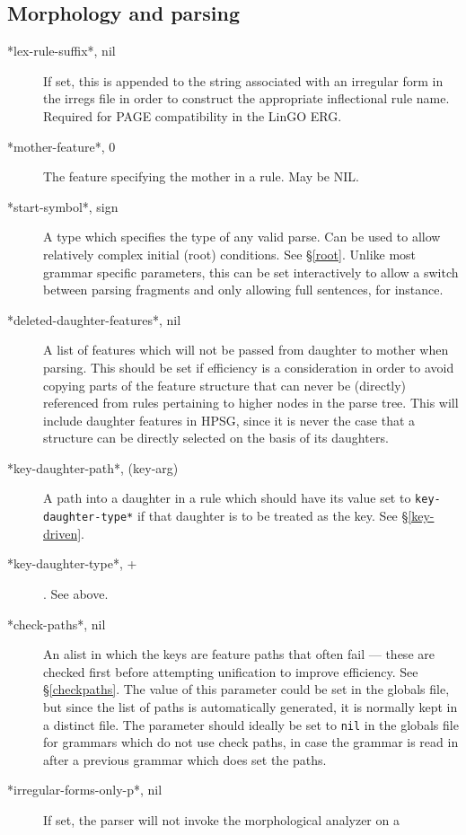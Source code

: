 \documentclass[12pt]{report}
\newcommand{\lkbparam}[1]{{\tt #1}}
\begin{document}
\subsection{Morphology and parsing}
\label{mpglob}
\begin{description}
\item[*lex-rule-suffix*, nil]  If set, this is appended to
the string associated with an irregular form in the irregs file in
order to construct the appropriate inflectional rule name. 
Required for PAGE compatibility in the LinGO ERG.
\item[*mother-feature*, 0] The feature specifying the mother in a rule.
May be NIL.
\item[*start-symbol*, sign] A type which specifies the type of any valid parse.
Can be used to allow relatively complex initial (root) conditions.
See \S\ref{root}.
Unlike most grammar specific parameters, this can be set interactively
to allow a switch between parsing fragments and only allowing full sentences, 
for instance.
\item[*deleted-daughter-features*, nil]
A list of features which will not be passed from daughter to mother
when parsing.  This should be set if efficiency is a consideration in order
to avoid copying parts of the feature structure that can never be
(directly) referenced from rules pertaining to higher nodes in the
parse tree.  This will include daughter features in HPSG, since it is
never the case that a structure can be directly selected on the basis of
its daughters.
\item[*key-daughter-path*, (key-arg)] A path into a daughter 
in a rule which should
have its value set to \lkbparam{*key-daughter-type*} if that daughter
is to be treated as the key.  See \S\ref{key-driven}.
\item[*key-daughter-type*, +].  See above.
\item[*check-paths*, nil]
An alist in which the keys are feature paths that often fail ---
these are checked first before attempting unification to improve efficiency.
See \S\ref{checkpaths}.
The value of this parameter could be set in the globals file, but since the
list of paths is automatically generated, it is normally kept in a distinct
file.  The parameter should ideally 
be set to {\tt nil} in the globals file for
grammars which do not use check paths, in case the grammar is read in after
a previous grammar which does set the paths.
\item[*irregular-forms-only-p*, nil]
If set, the parser will not invoke the morphological analyzer on a

\end{description}
\end{document}
